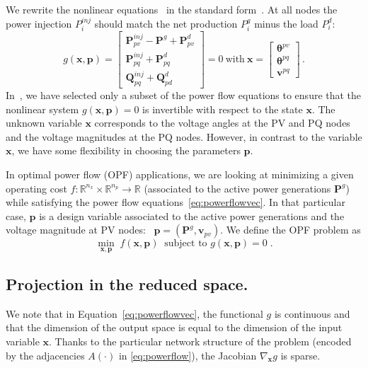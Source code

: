 We rewrite the nonlinear equations~
in the standard form~.
At all nodes the power injection $P^{inj}_i$
should match the net production $P_i^g$ minus the load $P_i^d$:
\begin{equation}
  \label{eq:powerflowvec}
  g(\bm{x}, \bm{p}) =
    \begin{bmatrix}
      \bm{P}_{pv}^{inj} - \bm{P}^{g} + \bm{P}_{pv}^d \\
      \bm{P}_{pq}^{inj} + \bm{P}_{pq}^d \\
      \bm{Q}_{pq}^{inj} + \bm{Q}_{pd}^d
    \end{bmatrix}
    = 0
    ~ \text{with} ~
    \bm{x} =
    \begin{bmatrix}
      \bm{\theta}^{pv} \\ \bm{\theta}^{pq} \\ \bm{v}^{pq}
    \end{bmatrix} \,.
\end{equation}
In~, we have selected only a subset of the power flow equations
 to ensure that the nonlinear system $g(\bm{x}, \bm{p}) = 0$
is invertible with respect to the state $\bm{x}$. The unknown variable $\bm{x}$
corresponds to the voltage
angles at the PV and PQ nodes and the voltage magnitudes at the PQ nodes.
However, in contrast to the variable $\bm{x}$, we have some flexibility in
choosing the parameters $\bm{p}$.

In optimal power flow (OPF) applications, we are looking at minimizing
a given operating cost $f: \mathbb{R}^{n_x} \times \mathbb{R}^{n_p} \to \mathbb{R}$
(associated to the active power generations $\bm{P}^g$) while satisfying
the power flow equations~\eqref{eq:powerflowvec}. In that particular case,
$\bm{p}$ is a design variable associated to the active power generations
and the voltage magnitude at PV nodes: ~$\bm{p} = (\bm{P}^g, \bm{v}_{pv})$.
We define the OPF problem as
\begin{equation}
  \label{eq:nonlinearopt}
  \min_{\bm{x}, \bm{p}} \; f(\bm{x}, \bm{p}) ~ \text{ subject to }
  g(\bm{x}, \bm{p}) = 0 \; .
\end{equation}

\subsection{Projection in the reduced space.}
\label{sec:background:reducedspace}
We note that in Equation~\eqref{eq:powerflowvec}, the functional $g$ is continuous
and that the dimension
of the output space is equal to the dimension of the input variable $\bm{x}$. Thanks
to the particular network structure of the problem (encoded by the adjacencies $A(\cdot)$
in \eqref{eq:powerflow}), the Jacobian $\nabla_{\bm{x}} g$ is sparse.

